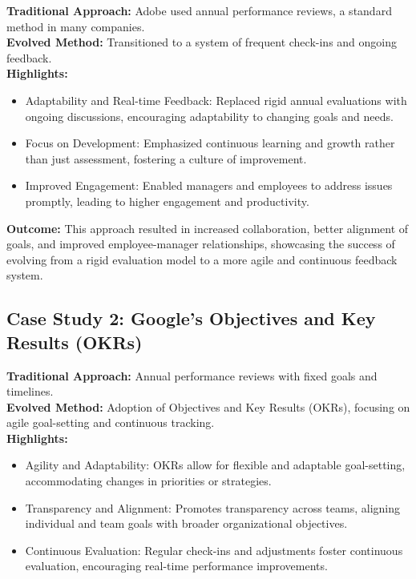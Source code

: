 \documentclass[a4paper, twoside]{article}
\begin{document}
\textbf{Traditional Approach:} Adobe used annual performance reviews, a standard method in many companies.\cite{AdobeCheckins}\\
\textbf{Evolved Method:} Transitioned to a system of frequent check-ins and ongoing feedback.\\

\textbf{Highlights:}
\begin{itemize}
    \item{Adaptability and Real-time Feedback:} Replaced rigid annual evaluations with ongoing discussions, encouraging adaptability to changing goals and needs.
    \item{Focus on Development:} Emphasized continuous learning and growth rather than just assessment, fostering a culture of improvement.
    \item{Improved Engagement:} Enabled managers and employees to address issues promptly, leading to higher engagement and productivity.
\end{itemize}

\textbf{Outcome:} This approach resulted in increased collaboration, better alignment of goals, and improved employee-manager relationships, showcasing the success of evolving from a rigid evaluation model to a more agile and continuous feedback system.

\subsection*{Case Study 2: Google's Objectives and Key Results (OKRs)}

\textbf{Traditional Approach:} Annual performance reviews with fixed goals and timelines.\\
\textbf{Evolved Method:} Adoption of Objectives and Key Results (OKRs), focusing on agile goal-setting and continuous tracking.\cite{GoogleOKRs}\\

\textbf{Highlights:}
\begin{itemize}
    \item{Agility and Adaptability:} OKRs allow for flexible and adaptable goal-setting, accommodating changes in priorities or strategies.
    \item{Transparency and Alignment:} Promotes transparency across teams, aligning individual and team goals with broader organizational objectives.
    \item{Continuous Evaluation:} Regular check-ins and adjustments foster continuous evaluation, encouraging real-time performance improvements.
\end{itemize}
\end{document}

